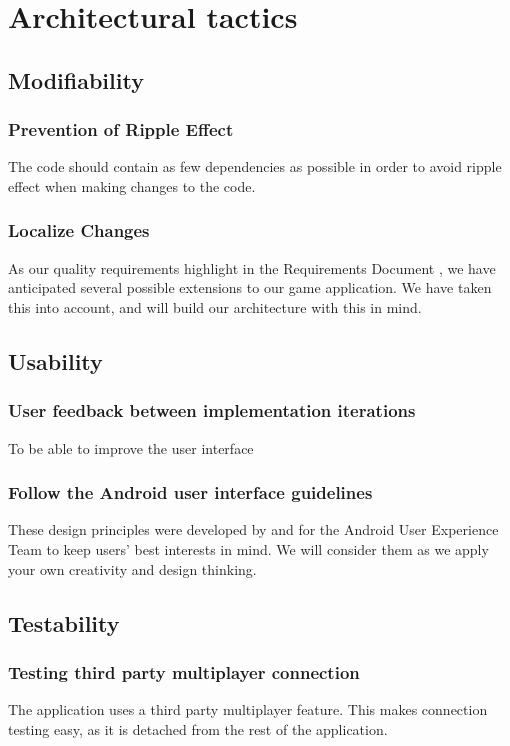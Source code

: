 \pagebreak

\section{Architectural tactics}

\subsection{Modifiability}                       

\subsubsection{Prevention of Ripple Effect}
The code should contain as few dependencies as possible in order to avoid ripple effect when making changes to the code.

\subsubsection{Localize Changes}
As our quality requirements highlight in the Requirements Document \cite{requirement}, we have anticipated several possible extensions to our game application. We have taken this into account, and will build our architecture with this in mind.

\subsection{Usability}

\subsubsection{User feedback between implementation iterations}
To be able to improve the user interface

\subsubsection{Follow the Android user interface guidelines} 
These design principles were developed by and for the Android User Experience Team to keep users' best interests in mind. We will consider them as we apply your own creativity and design thinking.

\subsection{Testability}
\subsubsection{Testing third party multiplayer connection}
The application uses a third party multiplayer feature. This makes connection testing easy, as it is detached from the rest of the application.